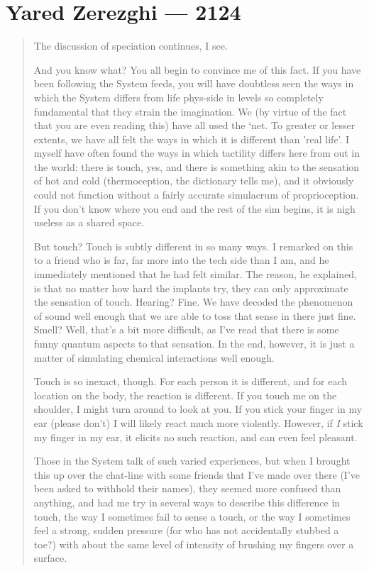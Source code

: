 \hypertarget{yared-zerezghi-2124}{%
\chapter{Yared Zerezghi — 2124}\label{yared-zerezghi-2124}}

\begin{quote}
The discussion of speciation continues, I see.

And you know what? You all begin to convince me of this fact. If you have been following the System feeds, you will have doubtless seen the ways in which the System differs from life phys-side in levels so completely fundamental that they strain the imagination. We (by virtue of the fact that you are even reading this) have all used the `net. To greater or lesser extents, we have all felt the ways in which it is different than 'real life'. I myself have often found the ways in which tactility differs here from out in the world: there is touch, yes, and there is something akin to the sensation of hot and cold (thermoception, the dictionary tells me), and it obviously could not function without a fairly accurate simulacrum of proprioception. If you don't know where you end and the rest of the sim begins, it is nigh useless as a shared space.

But touch? Touch is subtly different in so many ways. I remarked on this to a friend who is far, far more into the tech side than I am, and he immediately mentioned that he had felt similar. The reason, he explained, is that no matter how hard the implants try, they can only approximate the sensation of touch. Hearing? Fine. We have decoded the phenomenon of sound well enough that we are able to toss that sense in there just fine. Smell? Well, that's a bit more difficult, as I've read that there is some funny quantum aspects to that sensation. In the end, however, it is just a matter of simulating chemical interactions well enough.

Touch is so inexact, though. For each person it is different, and for each location on the body, the reaction is different. If you touch me on the shoulder, I might turn around to look at you. If you stick your finger in my ear (please don't) I will likely react much more violently. However, if \emph{I} stick my finger in my ear, it elicits no such reaction, and can even feel pleasant.

Those in the System talk of such varied experiences, but when I brought this up over the chat-line with some friends that I've made over there (I've been asked to withhold their names), they seemed more confused than anything, and had me try in several ways to describe this difference in touch, the way I sometimes fail to sense a touch, or the way I sometimes feel a strong, sudden pressure (for who has not accidentally stubbed a toe?) with about the same level of intensity of brushing my fingers over a surface.


\end{quote}
